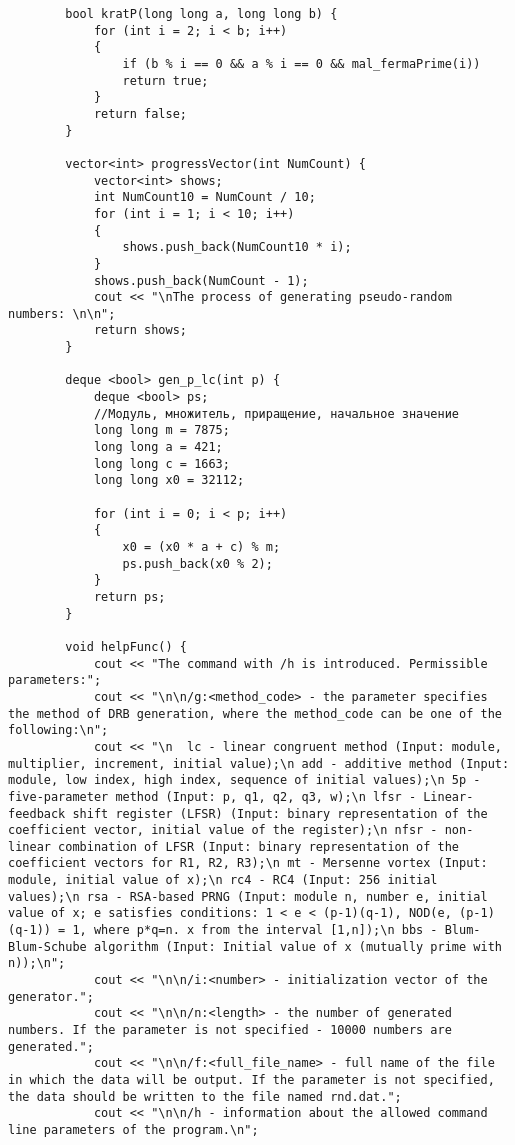 \documentclass[bachelor, och, coursework]{shiza}
\begin{document}
\begin{verbatim}
		bool kratP(long long a, long long b) {
			for (int i = 2; i < b; i++)
			{
				if (b % i == 0 && a % i == 0 && mal_fermaPrime(i))
				return true;
			}
			return false;
		}
		
		vector<int> progressVector(int NumCount) {
			vector<int> shows;
			int NumCount10 = NumCount / 10;
			for (int i = 1; i < 10; i++)
			{
				shows.push_back(NumCount10 * i);
			}
			shows.push_back(NumCount - 1);
			cout << "\nThe process of generating pseudo-random numbers: \n\n";
			return shows;
		}
		
		deque <bool> gen_p_lc(int p) {
			deque <bool> ps;
			//Модуль, множитель, приращение, начальное значение
			long long m = 7875;
			long long a = 421;
			long long c = 1663;
			long long x0 = 32112;
			
			for (int i = 0; i < p; i++)
			{
				x0 = (x0 * a + c) % m;
				ps.push_back(x0 % 2);
			}
			return ps;
		}
		
		void helpFunc() {
			cout << "The command with /h is introduced. Permissible parameters:";
			cout << "\n\n/g:<method_code> - the parameter specifies the method of DRB generation, where the method_code can be one of the following:\n";
			cout << "\n  lc - linear congruent method (Input: module, multiplier, increment, initial value);\n add - additive method (Input: module, low index, high index, sequence of initial values);\n 5p - five-parameter method (Input: p, q1, q2, q3, w);\n lfsr - Linear-feedback shift register (LFSR) (Input: binary representation of the coefficient vector, initial value of the register);\n nfsr - non-linear combination of LFSR (Input: binary representation of the coefficient vectors for R1, R2, R3);\n mt - Mersenne vortex (Input: module, initial value of x);\n rc4 - RC4 (Input: 256 initial values);\n rsa - RSA-based PRNG (Input: module n, number e, initial value of x; e satisfies conditions: 1 < e < (p-1)(q-1), NOD(e, (p-1)(q-1)) = 1, where p*q=n. x from the interval [1,n]);\n bbs - Blum-Blum-Schube algorithm (Input: Initial value of x (mutually prime with n));\n";
			cout << "\n\n/i:<number> - initialization vector of the generator.";
			cout << "\n\n/n:<length> - the number of generated numbers. If the parameter is not specified - 10000 numbers are generated.";
			cout << "\n\n/f:<full_file_name> - full name of the file in which the data will be output. If the parameter is not specified, the data should be written to the file named rnd.dat.";
			cout << "\n\n/h - information about the allowed command line parameters of the program.\n";
			

\end{verbatim}
\end{document}
